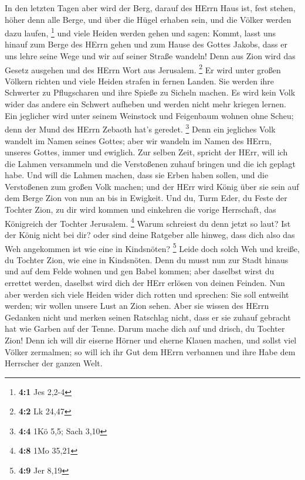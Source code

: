  In den letzten Tagen aber wird der Berg, darauf des HErrn
Haus ist, fest stehen, höher denn alle Berge, und über die Hügel erhaben
sein, und die Völker werden dazu laufen, \footnote{\textbf{4:1} Jes
  2,2-4}  und viele Heiden werden gehen und sagen: Kommt,
lasst uns hinauf zum Berge des HErrn gehen und zum Hause des Gottes
Jakobs, dass er uns lehre seine Wege und wir auf seiner Straße wandeln!
Denn aus Zion wird das Gesetz ausgehen und des HErrn Wort aus Jerusalem.
\footnote{\textbf{4:2} Lk 24,47}  Er wird unter großen
Völkern richten und viele Heiden strafen in fernen Landen. Sie werden
ihre Schwerter zu Pflugscharen und ihre Spieße zu Sicheln machen. Es
wird kein Volk wider das andere ein Schwert aufheben und werden nicht
mehr kriegen lernen.  Ein jeglicher wird unter seinem
Weinstock und Feigenbaum wohnen ohne Scheu; denn der Mund des HErrn
Zebaoth hat's geredet. \footnote{\textbf{4:4} 1Kö 5,5; Sach 3,10}
 Denn ein jegliches Volk wandelt im Namen seines Gottes;
aber wir wandeln im Namen des HErrn, unseres Gottes, immer und ewiglich.
 Zur selben Zeit, spricht der HErr, will ich die Lahmen
versammeln und die Verstoßenen zuhauf bringen und die ich geplagt habe.
 Und will die Lahmen machen, dass sie Erben haben sollen,
und die Verstoßenen zum großen Volk machen; und der HErr wird König über
sie sein auf dem Berge Zion von nun an bis in Ewigkeit.  Und
du, Turm Eder, du Feste der Tochter Zion, zu dir wird kommen und
einkehren die vorige Herrschaft, das Königreich der Tochter Jerusalem.
\footnote{\textbf{4:8} 1Mo 35,21}  Warum schreiest du denn
jetzt so laut? Ist der König nicht bei dir? oder sind deine Ratgeber
alle hinweg, dass dich also das Weh angekommen ist wie eine in
Kindsnöten? \footnote{\textbf{4:9} Jer 8,19}  Leide doch
solch Weh und kreiße, du Tochter Zion, wie eine in Kindsnöten. Denn du
musst nun zur Stadt hinaus und auf dem Felde wohnen und gen Babel
kommen; aber daselbst wirst du errettet werden, daselbst wird dich der
HErr erlösen von deinen Feinden.  Nun aber werden sich
viele Heiden wider dich rotten und sprechen: Sie soll entweiht werden;
wir wollen unsere Lust an Zion sehen.  Aber sie wissen des
HErrn Gedanken nicht und merken seinen Ratschlag nicht, dass er sie
zuhauf gebracht hat wie Garben auf der Tenne.  Darum mache
dich auf und drisch, du Tochter Zion! Denn ich will dir eiserne Hörner
und eherne Klauen machen, und sollst viel Völker zermalmen; so will ich
ihr Gut dem HErrn verbannen und ihre Habe dem Herrscher der ganzen Welt.
